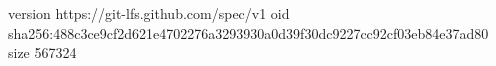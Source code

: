version https://git-lfs.github.com/spec/v1
oid sha256:488c3ce9cf2d621e4702276a3293930a0d39f30dc9227cc92cf03eb84e37ad80
size 567324
